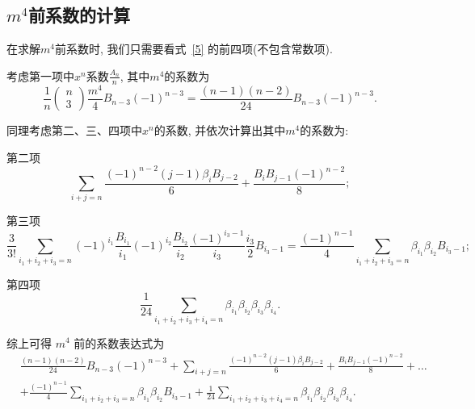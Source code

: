\documentclass{CombPaper}
\begin{document}
\subsection{$m^{4}$前系数的计算}
在求解$m^{4}$前系数时, 我们只需要看式~\eqref{5} 的前四项(不包含常数项).\par
考虑第一项中$x^{n}$系数$\frac{A_{n}}{n}$, 其中$m^{4}$的系数为
\begin{equation}
\frac{1}{n}\left(\begin{array}{c}
n \\
3
\end{array}\right) \frac{m^{4}}{4} B_{n-3}(-1)^{n-3}=\frac{(n-1)(n-2)}{24} B_{n-3}(-1)^{n-3}.
\end{equation}\par
同理考虑第二、三、四项中$x^{n}$的系数, 并依次计算出其中$m^{4}$的系数为:\par
第二项
\begin{equation}
    \sum_{i+j=n} \frac{(-1)^{n-2}(j-1) \beta_{i} B_{j-2}}{6}+\frac{B_{i} B_{j-1}(-1)^{n-2}}{8};
\end{equation}\par
第三项
\begin{equation}
    \frac{3}{3 !} \sum_{i_{1}+i_{2}+i_{3}=n}(-1)^{i_{1}} \frac{B_{i_{1}}}{i_{1}}(-1)^{i_{2}} \frac{B_{i_{2}}}{i_{2}} \frac{(-1)^{i_{3}-1}}{i_{3}} \frac{i_{3}}{2} B_{i_{3}-1}=\frac{(-1)^{n-1}}{4} \sum_{i_{1}+i_{2}+i_{3}=n} \beta_{i_{1}} \beta_{i_{2}} B_{i_{3}-1};
\end{equation}\par
第四项
\begin{equation}
\frac{1}{24} \sum_{i_{1}+i_{2}+i_{3}+i_{4}=n} \beta_{i_{1}} \beta_{i_{2}} \beta_{i_{3}} \beta_{i_{4}}.
\end{equation}\par
综上可得 $m^{4}$ 前的系数表达式为
\begin{equation}
\begin{aligned}
&\frac{(n-1)(n-2)}{24} B_{n-3}(-1)^{n-3}+\sum_{i+j=n} \frac{(-1)^{n-2}(j-1) \beta_{i} B_{j-2}}{6}+\frac{B_{i} B_{j-1}(-1)^{n-2}}{8}+\ldots \\
&+\frac{(-1)^{n-1}}{4} \sum_{i_{1}+i_{2}+i_{3}=n} \beta_{i_{1}} \beta_{i_{2}} B_{i_{3}-1}+\frac{1}{24} \sum_{i_{1}+i_{2}+i_{3}+i_{4}=n} \beta_{i_{1}} \beta_{i_{2}} \beta_{i_{3}} \beta_{i_{4}}.
\end{aligned}
\end{equation}\par
\end{document}
